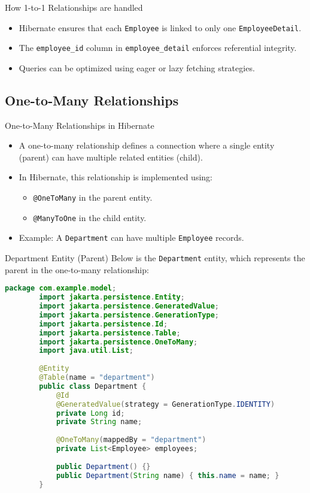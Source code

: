 \documentclass[aspectratio=169, table]{beamer}
\begin{document}
\begin{frame}{How 1-to-1 Relationships are handled}
	\vspace{20pt}
	\begin{itemize}
		\item Hibernate ensures that each \texttt{Employee} is linked to only one \texttt{EmployeeDetail}.
		\item The \texttt{employee\_id} column in \texttt{employee\_detail} enforces referential integrity.
		\item Queries can be optimized using eager or lazy fetching strategies.
	\end{itemize}
\end{frame}

\subsection{One-to-Many Relationships}

\begin{frame}{One-to-Many Relationships in Hibernate}
	\vspace{20pt}
	\begin{itemize}
		\item A one-to-many relationship defines a connection where a single entity (parent) can have multiple related entities (child).
		\item In Hibernate, this relationship is implemented using:
		\begin{itemize}
			\item \texttt{@OneToMany} in the parent entity.
			\item \texttt{@ManyToOne} in the child entity.
		\end{itemize}
		\item Example: A \texttt{Department} can have multiple \texttt{Employee} records.
	\end{itemize}
\end{frame}

\begin{frame}[fragile]{Department Entity (Parent)}
	\vspace{30pt}
	Below is the \texttt{Department} entity, which represents the parent in the one-to-many relationship:
	
	\begin{lstlisting}[language=Java, style=JavaStyle]
		package com.example.model;
		import jakarta.persistence.Entity;
		import jakarta.persistence.GeneratedValue;
		import jakarta.persistence.GenerationType;
		import jakarta.persistence.Id;
		import jakarta.persistence.Table;
		import jakarta.persistence.OneToMany;
		import java.util.List;
		
		@Entity
		@Table(name = "department")
		public class Department {
			@Id
			@GeneratedValue(strategy = GenerationType.IDENTITY)
			private Long id;
			private String name;
			
			@OneToMany(mappedBy = "department")
			private List<Employee> employees;
			
			public Department() {}
			public Department(String name) { this.name = name; }
		}
	\end{lstlisting}
\end{frame}
\end{document}
